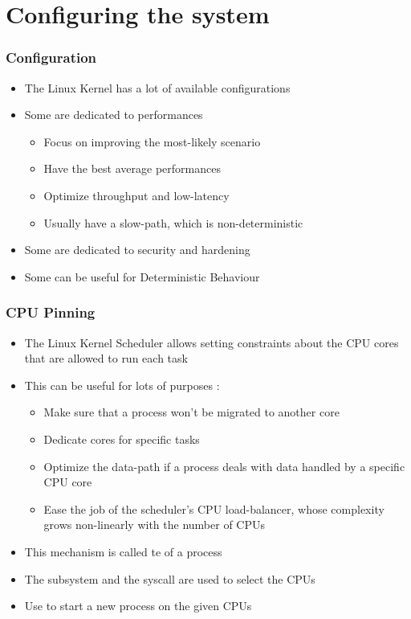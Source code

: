 \section{Configuring the system}

\begin{frame}
	\frametitle{Configuration}
	\begin{itemize}
		\item The Linux Kernel has a lot of available configurations
		\item Some are dedicated to performances
			\begin{itemize}
				\item Focus on improving the most-likely scenario
				\item Have the best average performances
				\item Optimize throughput and low-latency
				\item Usually have a slow-path, which is non-deterministic
			\end{itemize}
		\item Some are dedicated to security and hardening
		\item Some can be useful for Deterministic Behaviour
	\end{itemize}
\end{frame}

\begin{frame}
	\frametitle{CPU Pinning}
	\begin{itemize}
		\item The Linux Kernel Scheduler allows setting constraints about the CPU cores that are allowed
			to run each task
		\item This can be useful for lots of purposes :
			\begin{itemize}
				\item Make sure that a process won't be migrated to another core
				\item Dedicate cores for specific tasks
				\item Optimize the data-path if a process deals with data handled by a specific CPU core
				\item Ease the job of the scheduler's CPU load-balancer, whose complexity grows non-linearly with the number of CPUs
			\end{itemize}
		\item This mechanism is called te  of a process
		\item The  subsystem and the  syscall are used to select the CPUs
		\item Use  to start a new process on the given CPUs
	\end{itemize}
\end{frame}

